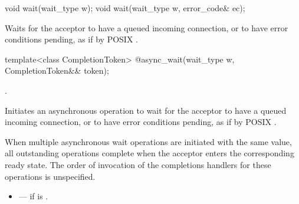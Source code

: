 \begin{itemdecl}
void wait(wait_type w);
void wait(wait_type w, error_code& ec);
\end{itemdecl}

\begin{itemdescr}
\pnum
\effects Waits for the acceptor to have a queued incoming connection, or to have error conditions pending, as if by POSIX .
\end{itemdescr}

\begin{itemdecl}
template<class CompletionToken>
  @\DEDUCED@ async_wait(wait_type w, CompletionToken&& token);
\end{itemdecl}

\begin{itemdescr}
\pnum
\completionsig {}.

\pnum
\effects Initiates an asynchronous operation to wait for the acceptor to have a queued incoming connection, or to have error conditions pending, as if by POSIX .

\pnum
When multiple asynchronous wait operations are initiated with the same  value, all outstanding operations complete when the acceptor enters the corresponding ready state. The order of invocation of the completions handlers for these operations is unspecified.

\pnum
\errors
\begin{itemize}
\item
{} --- if  is .
\end{itemize}
\end{itemdescr}




